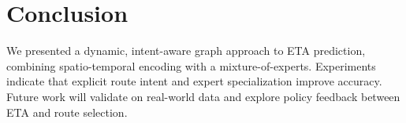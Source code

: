 \section{Conclusion}
We presented a dynamic, intent-aware graph approach to ETA prediction, combining spatio-temporal encoding with a mixture-of-experts. Experiments indicate that explicit route intent and expert specialization improve accuracy. Future work will validate on real-world data and explore policy feedback between ETA and route selection.
